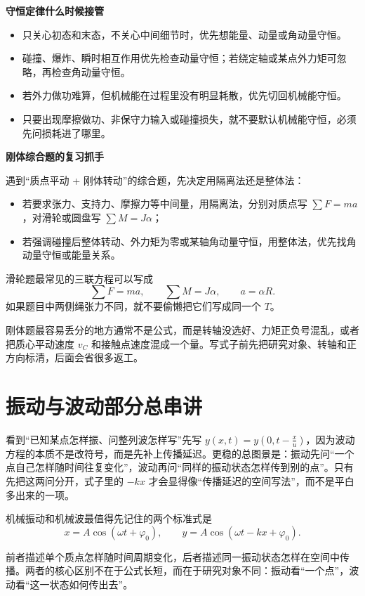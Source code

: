 \documentclass[lang=cn,11pt]{elegantbook}
\newcommand{\bridge}[1]{\begin{note}#1\end{note}}
\begin{document}
\textbf{守恒定律什么时候接管}

\begin{itemize}
 \item 只关心初态和末态，不关心中间细节时，优先想能量、动量或角动量守恒。
 \item 碰撞、爆炸、瞬时相互作用优先检查动量守恒；若绕定轴或某点外力矩可忽略，再检查角动量守恒。
 \item 若外力做功难算，但机械能在过程里没有明显耗散，优先切回机械能守恒。
 \item 只要出现摩擦做功、非保守力输入或碰撞损失，就不要默认机械能守恒，必须先问损耗进了哪里。
\end{itemize}

\textbf{刚体综合题的复习抓手}

遇到“质点平动 + 刚体转动”的综合题，先决定用隔离法还是整体法：
\begin{itemize}
 \item 若要求张力、支持力、摩擦力等中间量，用隔离法，分别对质点写 \(\sum F=ma\)，对滑轮或圆盘写 \(\sum M=J\alpha\)；
 \item 若强调碰撞后整体转动、外力矩为零或某轴角动量守恒，用整体法，优先找角动量守恒或能量关系。
\end{itemize}

滑轮题最常见的三联方程可以写成
\[
\sum F=ma,\qquad \sum M=J\alpha,\qquad a=\alpha R.
\]
如果题目中两侧绳张力不同，就不要偷懒把它们写成同一个 \(T\)。

\begin{remark}
刚体题最容易丢分的地方通常不是公式，而是转轴没选好、力矩正负号混乱，或者把质心平动速度 \(v_C\) 和接触点速度混成一个量。写式子前先把研究对象、转轴和正方向标清，后面会省很多返工。
\end{remark}

\section{振动与波动部分总串讲}

\bridge{看到“已知某点怎样振、问整列波怎样写”先写 \(y(x,t)=y\!\left(0,t-\frac{x}{u}\right)\)，因为波动方程的本质不是改符号，而是先补上传播延迟。更稳的总图景是：振动先问“一个点自己怎样随时间往复变化”，波动再问“同样的振动状态怎样传到别的点”。只有先把这两问分开，式子里的 \(-kx\) 才会显得像“传播延迟的空间写法”，而不是平白多出来的一项。}

机械振动和机械波最值得先记住的两个标准式是
\[
x=A\cos(\omega t+\varphi_0),\qquad y=A\cos(\omega t-kx+\varphi_0).
\]

前者描述单个质点怎样随时间周期变化，后者描述同一振动状态怎样在空间中传播。两者的核心区别不在于公式长短，而在于研究对象不同：振动看“一个点”，波动看“这一状态如何传出去”。
\end{document}
